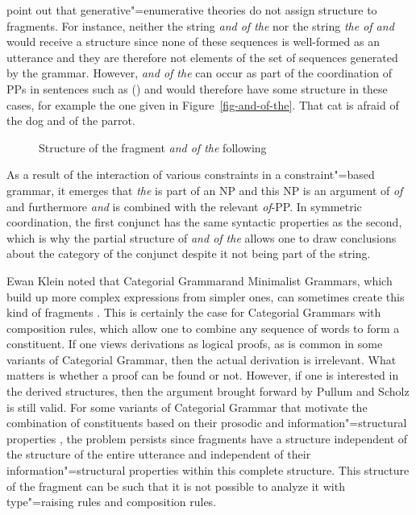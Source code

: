 \mbox{}\citet[Section~3.2]{PS2001a} point out that generative"=enumerative theories do not assign structure to fragments.
For instance, neither the string \emph{and of the} nor the string \emph{the of and} would receive a
structure since none of these sequences is well-formed as an utterance and they are therefore not elements of the set of sequences generated by the grammar. However, \emph{and of the}
can occur as part of the coordination of PPs in sentences such as () and would therefore have some structure in these cases,
for example the one given in Figure~\vref{fig-and-of-the}.%
\ea
That cat is afraid of the dog and of the parrot.
\z
\begin{figure}
\centering
{}
\caption{\label{fig-and-of-the}Structure of the fragment \emph{and of the} following
  }
\end{figure}%
As a result of the interaction of various constraints in a constraint"=based grammar, it emerges that \emph{the}
is part of an NP and this NP is an argument of \emph{of} and furthermore \emph{and} is combined with the relevant
\emph{of}-PP. In symmetric coordination, the first conjunct has the same syntactic properties as the second, which
is why the partial structure of \emph{and of the} allows one to draw conclusions about the category of the conjunct
despite it not being part of the string.

Ewan Klein noted that Categorial Grammar\indexcg and Minimalist Grammars, which build up more complex
expressions from simpler ones, can sometimes create this kind of fragments \citep[]{Pullum2013a}.
This is certainly the case for Categorial Grammars with composition rules, which allow one to
combine any sequence of words to form a constituent. If one views derivations as logical proofs, as
is common in some variants of Categorial Grammar, then the actual derivation is irrelevant. What matters is whether a
proof can be found or not. However, if one is interested in the derived structures, then the argument brought forward by Pullum and Scholz is still
valid. For some variants of Categorial Grammar that motivate the combination of constituents based on their prosodic
and information"=structural properties \citep[Section~3]{Steedman91a}, the problem persists since fragments have
a structure independent of the structure of the entire utterance and independent of their
information"=structural properties within this complete structure. This structure of the fragment
can be such that it is not possible to analyze it with type"=raising rules and composition
rules.

